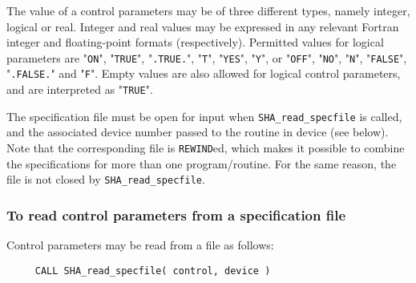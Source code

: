 \documentclass{galahad}
\newcommand{\packagename}{SHA}
\begin{document}
The value of a control parameters may be of three different types, namely
integer, logical or real.
Integer and real values may be expressed in any relevant Fortran integer and
floating-point formats (respectively). Permitted values for logical
parameters are "{\tt ON}", "{\tt TRUE}", "{\tt .TRUE.}", "{\tt T}", 
"{\tt YES}", "{\tt Y}", or "{\tt OFF}", "{\tt NO}",
"{\tt N}", "{\tt FALSE}", "{\tt .FALSE.}" and "{\tt F}". 
Empty values are also allowed for 
logical control parameters, and are interpreted as "{\tt TRUE}".  

The specification file must be open for 
input when {\tt \packagename\_read\_specfile}
is called, and the associated device number 
passed to the routine in device (see below). 
Note that the corresponding 
file is {\tt REWIND}ed, which makes it possible to combine the specifications 
for more than one program/routine.  For the same reason, the file is not
closed by {\tt \packagename\_read\_specfile}.

\subsubsection{To read control parameters from a specification file}
\label{readspec}

Control parameters may be read from a file as follows:
\hskip0.5in 
\def\baselinestretch{0.8} {\tt \begin{verbatim}
     CALL SHA_read_specfile( control, device )
\end{verbatim}
}
\def\baselinestretch{1.0}
\end{document}
